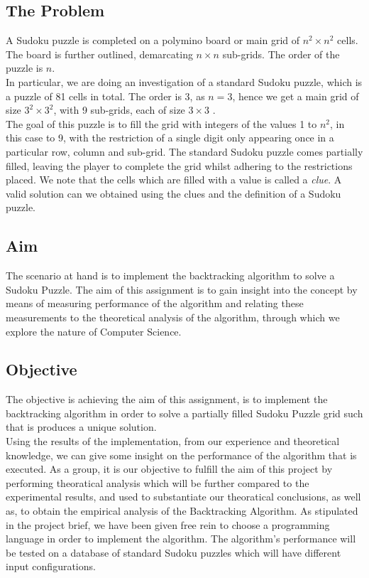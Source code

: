 \documentclass[12pt]{article}
\begin{document}
\subsection{The Problem}
A Sudoku puzzle is completed on a polymino board or main grid of $ n^2 \times n^2$ cells. The board is further outlined, demarcating $n \times n $ sub-grids. The order of the puzzle is $n$. \\
In particular, we are doing an investigation of a standard Sudoku puzzle, which is a puzzle of 81 cells in total. The order is 3, as $n = 3$, hence we get a main grid of size $3^2\times 3^2$, with 9 sub-grids, each of size $ 3\times 3 $ .\\
The goal of this puzzle is to fill the grid with integers of the values 1 to $n^2$, in this case to 9, with the restriction of a single digit only appearing once in a particular row, column and sub-grid. The standard Sudoku puzzle comes partially filled, leaving the player to complete the grid whilst adhering to the restrictions placed. We note that the cells which are  filled with a value is called a \textsl{clue}. A valid solution can we obtained using the clues and the definition of a Sudoku puzzle.  
  
\subsection{Aim}
\begin{flushleft}
The scenario at hand is to implement the backtracking algorithm to solve a Sudoku Puzzle. The aim of this assignment is to gain insight into the concept by means of measuring performance of the algorithm and relating these  measurements to the theoretical analysis of the algorithm, through which we explore the nature of Computer Science. 
\end{flushleft}
\subsection{Objective}
\begin{flushleft}
The objective is achieving the aim of this assignment, is to implement the backtracking algorithm in order to solve a partially filled Sudoku Puzzle grid such that is produces a unique solution. \\
Using the results of the implementation, from our experience and theoretical knowledge, we can give some insight on the performance of the algorithm that is executed. As a group, it is our objective to fulfill the aim of this project by performing theoratical analysis which will be further compared to the experimental results, and used to substantiate our theoratical conclusions, as well as, to obtain the empirical analysis of the Backtracking Algorithm. As stipulated in the project brief, we have been given free rein to choose a programming language in order to implement the algorithm. The algorithm's performance will be tested on a database of standard Sudoku puzzles which will have different input configurations. 
\end{flushleft}	
\end{document}
